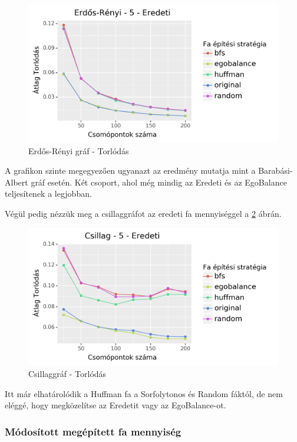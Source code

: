 \documentclass[12pt]{report}
\begin{document}
\begin{figure}[H]
	\begin{center}
		\includegraphics[width=0.9\linewidth]{pictures/erdos_con_e.png}
		\caption{Erdős-Rényi gráf - Torlódás}
		\label{erdos-con}
	\end{center}
\end{figure}

A grafikon szinte megegyezően ugyanazt az eredmény mutatja mint a Barabási-Albert gráf esetén.
Két csoport, ahol még mindig az Eredeti és az EgoBalance teljesítenek a legjobban.

Végül pedig nézzük meg a csillaggráfot az eredeti fa mennyiséggel a \ref{star-con} ábrán.

\begin{figure}[H]
	\begin{center}
		\includegraphics[width=0.9\linewidth]{pictures/star_con_e.png}
		\caption{Csillaggráf - Torlódás}
		\label{star-con}
	\end{center}
\end{figure}

Itt már elhatárolódik a Huffman fa a Sorfolytonos és Random fáktól, de nem eléggé, hogy megközelítse az Eredetit vagy az EgoBalance-ot.

\subsubsection{Módosított megépített fa mennyiség}
\end{document}
